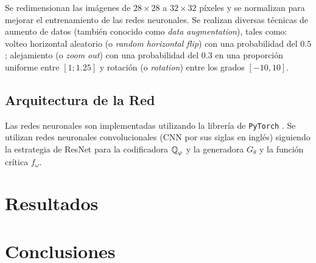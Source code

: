 Se redimensionan las imágenes de $28\times28$ a $32\times32$ píxeles y se normalizan para mejorar el entrenamiento de las redes neuronales. Se realizan diversas técnicas de aumento de datos (también conocido como \textit{data augmentation}), tales como: volteo horizontal aleatorio (o \textit{random horizontal flip}) con una probabilidad del $0.5$; alejamiento (o \textit{zoom out}) con una probabilidad del $0.3$ en una proporción uniforme entre $[1; 1.25]$ y rotación (o \textit{rotation}) entre los grados $[-10, 10]$.


\subsection{Arquitectura de la Red}\label{ssec:arquitectura-red}  %

Las redes neuronales son implementadas utilizando la librería de \texttt{PyTorch} \cite{paszke2019pytorch}. Se utilizan redes neuronales convolucionales (CNN por sus siglas en inglés) siguiendo la estrategia de ResNet \cite{he2016deep} para la codificadora $\ProbQ_\varphi$ y la generadora $G_\theta$ y la función crítica $f_\omega$.


\section{Resultados}\label{sec:resultados-wae-wgan}  %


\section{Conclusiones}\label{sec:conclusiones-wae-wgan}  %


